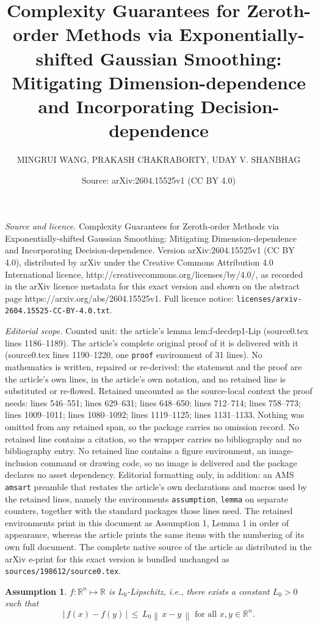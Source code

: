 \documentclass[10pt,a4paper]{amsart}
\title{Complexity Guarantees for Zeroth-order Methods via Exponentially-shifted Gaussian Smoothing: Mitigating Dimension-dependence and Incorporating Decision-dependence}
\author{MINGRUI WANG, PRAKASH CHAKRABORTY, UDAY V. SHANBHAG}
\date{Source: arXiv:2604.15525v1 (CC BY 4.0)}
\newtheorem{assumption}{Assumption}
\newcommand{\R}{\mathbb R}
\newcommand{\lln}{\left|}
\newcommand{\lnn}{\left\|}
\newcommand{\rnn}{\right\|}
\newcommand{\rrn}{\right|}
\begin{document}
\maketitle

\noindent\emph{Source and licence.} Complexity Guarantees for Zeroth-order Methods via Exponentially-shifted Gaussian Smoothing: Mitigating Dimension-dependence and Incorporating Decision-dependence. Version arXiv:2604.15525v1 (CC BY 4.0), distributed by arXiv under the Creative Commons Attribution 4.0 International licence, http://creativecommons.org/licenses/by/4.0/, as recorded in the arXiv licence metadata for this exact version and shown on the abstract page https://arxiv.org/abs/2604.15525v1. Full licence notice: \texttt{licenses/arxiv-2604.15525-CC-BY-4.0.txt}.\par\smallskip

\noindent\textit{Editorial scope.} Counted unit: the article's lemma lem:f-decdep1-Lip (source0.tex lines 1186--1189). The article's complete original proof of it is delivered with it (source0.tex lines 1190--1220, one \texttt{proof} environment of 31 lines). No mathematics is written, repaired or re-derived: the statement and the proof are the article's own lines, in the article's own notation, and no retained line is substituted or re-flowed.  Retained uncounted as the source-local context the proof needs: lines 546--551; lines 629--631; lines 648--650; lines 712--714; lines 758--773; lines 1009--1011; lines 1080--1092; lines 1119--1125; lines 1131--1133.  Nothing was omitted from any retained span, so the package carries no omission record.  No retained line contains a citation, so the wrapper carries no bibliography and no bibliography entry.  No retained line contains a figure environment, an image-inclusion command or drawing code, so no image is delivered and the package declares no asset dependency.  Editorial formatting only, in addition: an AMS \texttt{amsart} preamble that restates the article's own declarations and macros used by the retained lines, namely the environments \texttt{assumption}, \texttt{lemma} on separate counters, together with the standard packages those lines need.  The retained environments print in this document as Assumption 1, Lemma 1 in order of appearance, whereas the article prints the same items with the numbering of its own full document.  The complete native source of the article as distributed in the arXiv e-print for this exact version is bundled unchanged as \texttt{sources/198612/source0.tex}.
	\begin{assumption}\label{ass:f-Lip}
		$f: \R^n \mapsto \R$ is $L_0$-Lipschitz, i.e., there exists a constant $L_0>0$ such that
		$$
		\lln \, f(x) - f(y)\, \rrn \, \leq \,  L_0 \lnn \, x-y \, \rnn \text{ for all }x,y \in \R^n. 
		$$ 
	\end{assumption}
\end{document}
